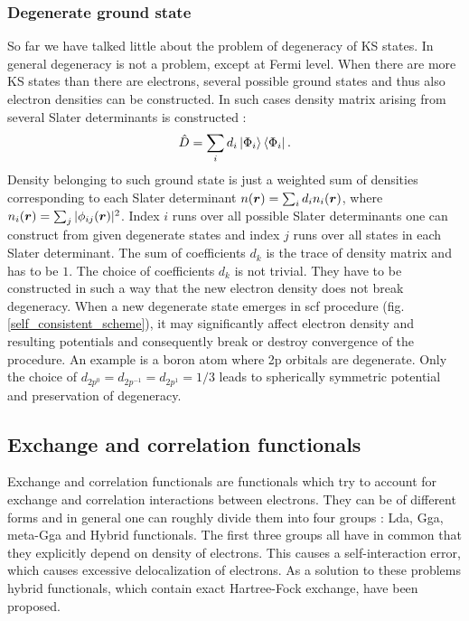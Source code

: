 \documentclass[openany, longbibliography,slovene,a4paper,12pt]{article}
\def\vec#1{\mbox{\boldmath$#1$}}
\begin{document}
\subsubsection{Degenerate ground state}
So far we have talked little about the problem of degeneracy of KS states. In
general degeneracy is not a problem, except at Fermi level. When there are more
KS states than there are electrons, several possible ground states and thus also
electron densities can be constructed. In such cases density matrix arising from
several Slater determinants is constructed \cite{advanced_course}:
\begin{equation}
  \hat D = \sum_i d_i\ket{\Phi_i} \bra{\Phi_i}.
  \end{equation}
Density belonging to such ground state is just a weighted sum of densities
corresponding to each Slater determinant $n(\vec r)=\sum_id_in_i(\vec r)$, where
$n_i(\vec r)=\sum_j|\phi_{ij}(\vec r)|^2$. Index $i$ runs over all possible
Slater determinants one can construct from given degenerate states and index $j$
runs over all states in each Slater determinant. The sum of coefficients $d_k$
is the trace of density matrix and has to be $1$. The choice of coefficients
$d_k$ is not trivial. They have to be constructed in such a way that the new
electron density does not break degeneracy. When a new degenerate state emerges in
scf procedure (fig. \ref{self_consistent_scheme}), it may significantly affect
electron density and resulting potentials and consequently break or destroy
convergence of the procedure. An example is a boron atom where 2p orbitals are
degenerate. Only the choice of $d_{2p^0}=d_{2p^{-1}}=d_{2p^1}=1/3$ leads to spherically symmetric potential and preservation of degeneracy\cite{advanced_course}.

\subsection{Exchange and correlation functionals}
Exchange and correlation functionals are functionals which try to account for
exchange and correlation interactions between electrons. They can be of
different forms and in general one can roughly divide them into four groups
\cite{challenges_den_fun_theor, presc_desig_selec_densit_funct_approx}: Lda, Gga, meta-Gga and Hybrid functionals.
The first three groups all have in common that they explicitly depend on density
of electrons. This causes a self-interaction error, which causes excessive
delocalization of electrons. As a solution to these problems hybrid
functionals, which contain exact Hartree-Fock exchange, have been proposed.
\end{document}
